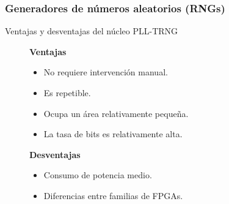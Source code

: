 \documentclass[10pt]{beamer}
\begin{document}
\begin{frame}
    \frametitle{Generadores de números aleatorios (RNGs)}
    \begin{block}{Ventajas y desventajas del núcleo PLL-TRNG}
        \justifying
          \begin{figure}[!h]
				\begin{minipage}[t]{0.48\textwidth}
					\textbf{Ventajas}
					\begin{itemize}
						\justifying
						\item No requiere intervención manual.
						\item Es repetible.
						\item Ocupa un área relativamente pequeña.
						\item La tasa de bits es relativamente alta.
					\end{itemize}
				\end{minipage} \hfill \begin{minipage}[t]{0.48\textwidth}
					\textbf{Desventajas}
					\begin{itemize}
						\justifying
						\item Consumo de potencia medio.
						\item Diferencias entre familias de FPGAs.
					\end{itemize}
				\end{minipage}
			\end{figure}		
	\end{block}
\end{frame}
\end{document}
